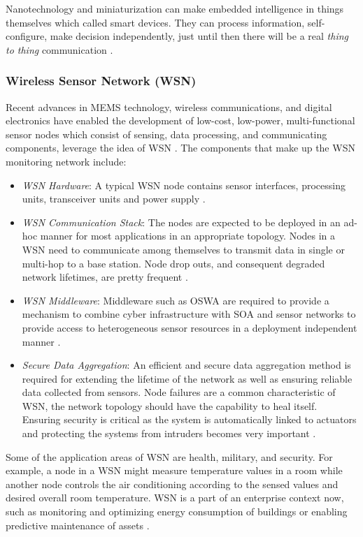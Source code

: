 Nanotechnology and miniaturization can make embedded intelligence in things themselves which called smart devices. They can process information, self-configure, make decision independently, just until then there will be a real \textit{thing to thing}  communication \cite{IOTFUTURE}.
\subsubsection{Wireless Sensor Network (WSN)}
Recent advances in \acs{MEMS} technology, wireless communications, and digital electronics have enabled the development of low-cost, low-power, multi-functional
sensor nodes which consist of sensing, data processing, and communicating components, leverage the idea of \acs{WSN} \cite{WSNSURVEY,BPMN4WSN}. The components that make up the WSN monitoring network include:
\begin{itemize}
	\item \textit{\acs{WSN} Hardware}: A typical \acs{WSN} node contains sensor interfaces, processing units, transceiver units and power supply \cite{IOTGUBBI}.
	\item \textit{\acs{WSN} Communication Stack}: The nodes are expected to be deployed
	in an ad-hoc manner for most applications in an appropriate topology. Nodes in a \acs{WSN} need to communicate among themselves to transmit data in single or multi-hop to a base station. Node drop outs, and consequent degraded network lifetimes, are pretty frequent \cite{IOTGUBBI,WSNSURVEY}.
	\item \textit{\acs{WSN} Middleware}: Middleware such as \acs{OSWA} are required to provide a mechanism to combine cyber infrastructure with \acs{SOA} and sensor networks to provide access to heterogeneous sensor resources in a deployment independent manner \cite{IOTGUBBI}.
	\item \textit{Secure Data Aggregation}: An efficient and secure data aggregation
	method is required for extending the lifetime of the network as well as ensuring reliable data collected from sensors. Node failures are a common characteristic of \acs{WSN}, the network topology should have the capability to heal itself. Ensuring security is critical as the system is automatically linked to actuators and protecting the systems from intruders becomes very important \cite{IOTGUBBI}.
\end{itemize}
Some of the application areas of \acs{WSN} are health, military, and security. For example, a node in a \acs{WSN} might measure temperature values in a room while another node controls the air conditioning according to the sensed values and desired overall room temperature. \acs{WSN} is a part of an enterprise context now, such as monitoring and optimizing energy consumption of buildings or enabling predictive maintenance of assets \cite{BPMN4WSN,WSNSURVEY}.
